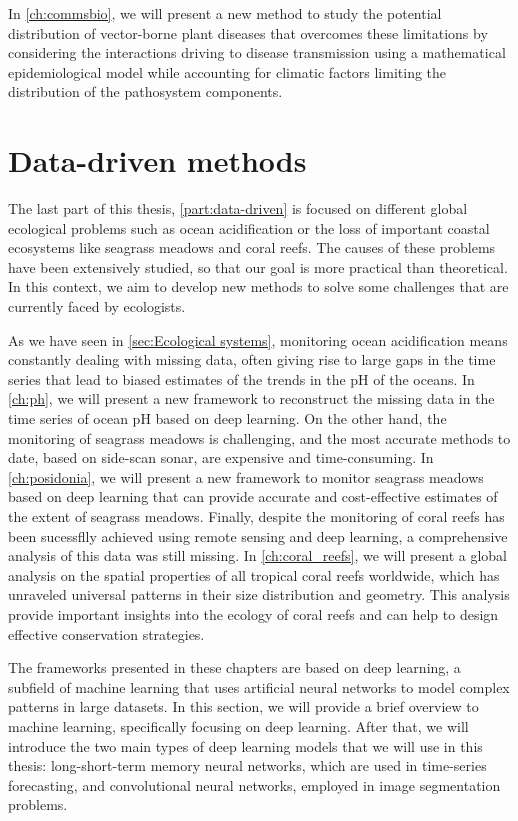 In \cref{ch:commsbio}, we will present a new method to study the potential
distribution of vector-borne plant diseases that overcomes these limitations by
considering the interactions driving to disease transmission using a
mathematical epidemiological model while accounting for climatic factors
limiting the distribution of the pathosystem components.

\section{\label{sec:Data-driven methods} Data-driven methods}

The last part of this thesis, \cref{part:data-driven} is focused on different
global ecological problems such as ocean acidification or the loss of important
coastal ecosystems like seagrass meadows and coral reefs. The causes of
these problems have been extensively studied, so that our goal is more
practical than theoretical. In this context, we aim to develop new methods to
solve some challenges that are currently faced by ecologists.

As we have seen in \cref{sec:Ecological systems}, monitoring ocean
acidification means constantly dealing with missing data, often giving rise to
large gaps in the time series that lead to biased estimates of the trends in
the pH of the oceans. In \cref{ch:ph}, we will present a new framework to
reconstruct the missing data in the time series of ocean pH based on deep
learning. On the other hand, the monitoring of seagrass meadows is challenging,
and the most accurate methods to date, based on side-scan sonar, are expensive
and time-consuming. In \cref{ch:posidonia}, we will present a new framework to
monitor seagrass meadows based on deep learning that can provide accurate and
cost-effective estimates of the extent of seagrass meadows. Finally, despite
the monitoring of coral reefs has been sucessflly achieved using remote sensing
and deep learning, a comprehensive analysis of this data was still missing.
In \cref{ch:coral_reefs}, we will present a global analysis on the spatial
properties of all tropical coral reefs worldwide, which has unraveled universal
patterns in their size distribution and geometry. This analysis provide
important insights into the ecology of coral reefs and can help to design
effective conservation strategies.

The frameworks presented in these chapters are based on deep learning, a
subfield of machine learning that uses artificial neural networks to model
complex patterns in large datasets. In this section, we will provide a brief
overview to machine learning, specifically focusing on deep learning. After
that, we will introduce the two main types of deep learning models that we will
use in this thesis: long-short-term memory neural networks, which are used in
time-series forecasting, and convolutional neural networks, employed in image
segmentation problems.

